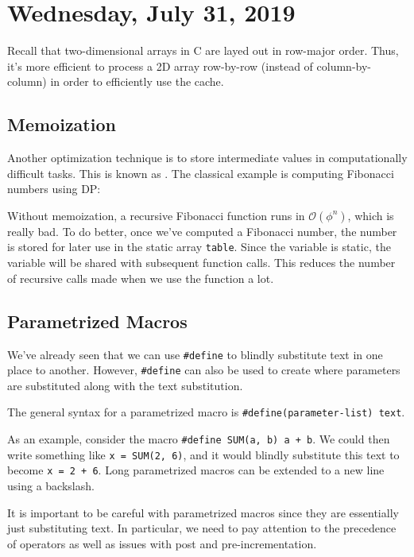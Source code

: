 \section{Wednesday, July 31, 2019}
Recall that two-dimensional arrays in C are layed out in row-major order. Thus, it's more efficient to process a 2D array row-by-row (instead of column-by-column) in order to efficiently use the cache.


\subsection{Memoization}

Another optimization technique is to store intermediate values in computationally difficult tasks. This is known as . The classical example is computing Fibonacci numbers using DP:


\lstset{
caption=DP Fibonacci 
}
\begin{center}

\end{center}

Without memoization, a recursive Fibonacci function runs in $\mathcal{O}(\phi^{n})$, which is really bad. To do better, once we've computed a Fibonacci number, the number is stored for later use in the static array \verb!table!. Since the variable is static, the variable will be shared with subsequent function calls. This reduces the number of recursive calls made when we use the function a lot.


\subsection{Parametrized Macros}

We've already seen that we can use \verb!#define! to blindly substitute text in one place to another. However, \verb!#define! can also be used to create  where parameters are substituted along with the text substitution.

The general syntax for a parametrized macro is \verb!#define(parameter-list) text!. 

As an example, consider the macro \verb!#define SUM(a, b) a + b!. We could then write something like \verb!x = SUM(2, 6)!, and it would blindly substitute this text to become \verb!x = 2 + 6!. Long parametrized macros can be extended to a new line using a backslash.


It is important to be careful with parametrized macros since they are essentially just substituting text. In particular, we need to pay attention to the precedence of operators as well as issues with post and pre-incrementation. 

